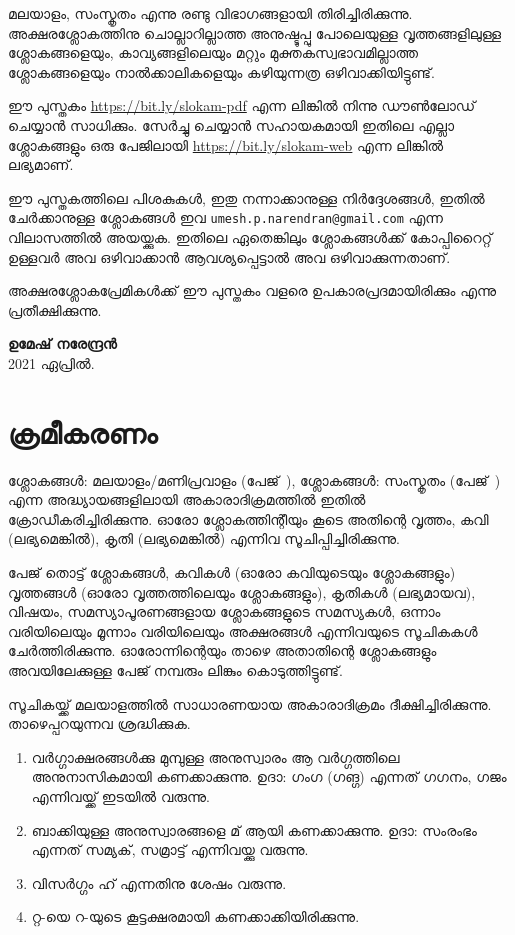 \documentclass{article}
\begin{document}
മലയാളം, സംസ്കൃതം എന്നു രണ്ടു വിഭാഗങ്ങളായി തിരിച്ചിരിക്കുന്നു.   അക്ഷരശ്ലോകത്തിനു ചൊല്ലാറില്ലാത്ത
അനുഷ്ടുപ്പു പോലെയുള്ള വൃത്തങ്ങളിലുള്ള ശ്ലോകങ്ങളെയും, കാവ്യങ്ങളിലെയും മറ്റും
മുക്തകസ്വഭാവമില്ലാത്ത ശ്ലോകങ്ങളെയും നാല്‍ക്കാലികളെയും കഴിയുന്നത്ര ഒഴിവാക്കിയിട്ടുണ്ട്. 

ഈ പുസ്തകം
\url{https://bit.ly/slokam-pdf}
എന്ന ലിങ്കില്‍ നിന്നു ഡൗണ്‍ലോഡ് ചെയ്യാന്‍ സാധിക്കും.  സേര്‍ച്ചു ചെയ്യാന്‍ സഹായകമായി ഇതിലെ എല്ലാ ശ്ലോകങ്ങളും ഒരു
പേജിലായി
\url{https://bit.ly/slokam-web}
എന്ന ലിങ്കില്‍ ലഭ്യമാണ്.

ഈ പുസ്തകത്തിലെ പിശകുകള്‍, ഇതു നന്നാക്കാനുള്ള നിര്‍ദ്ദേശങ്ങള്‍, ഇതില്‍ ചേര്‍ക്കാനുള്ള ശ്ലോകങ്ങള്‍
ഇവ \texttt{umesh.p.narendran@gmail.com} എന്ന വിലാസത്തില്‍ അയയ്ക്കുക.  ഇതിലെ
ഏതെങ്കിലും ശ്ലോകങ്ങള്‍ക്ക് കോപ്പിറൈറ്റ് ഉള്ളവര്‍ അവ ഒഴിവാക്കാന്‍ ആവശ്യപ്പെട്ടാല്‍ അവ
ഒഴിവാക്കുന്നതാണ്. 

അക്ഷരശ്ലോകപ്രേമികള്‍ക്ക് ഈ പുസ്തകം വളരെ ഉപകാരപ്രദമായിരിക്കും എന്നു പ്രതീക്ഷിക്കുന്നു.

\begin{flushright}
\textbf{ഉമേഷ് നരേന്ദ്രന്‍}\\
2021 ഏപ്രില്‍. 
\end{flushright}


\clearpage

\tableofcontents

\clearpage
\section{ക്രമീകരണം}
ശ്ലോകങ്ങൾ: മലയാളം/മണിപ്രവാളം (പേജ്~\pageref{sec:slokams:mal}), ശ്ലോകങ്ങൾ: സംസ്കൃതം (പേജ്~\pageref{sec:slokams:san}) എന്ന
അദ്ധ്യായങ്ങളിലായി അകാരാദിക്രമത്തിൽ \NTotalSlokams{} ഇതിൽ
ക്രോഡീകരിച്ചിരിക്കുന്നു. ഓരോ ശ്ലോകത്തിന്റീയും കൂടെ അതിന്റെ വൃത്തം, കവി (ലഭ്യമെങ്കിൽ),
കൃതി (ലഭ്യമെങ്കിൽ) എന്നിവ സൂചിപ്പിച്ചിരിക്കുന്നു.

പേജ് \pageref{sec:index} തൊട്ട് ശ്ലോകങ്ങൾ, കവികൾ (ഓരോ കവിയുടെയും ശ്ലോകങ്ങളും) വൃത്തങ്ങൾ (ഓരോ വൃത്തത്തിലെയും
ശ്ലോകങ്ങളും), കൃതികൾ (ലഭ്യമായവ), വിഷയം, സമസ്യാപൂരണങ്ങളായ ശ്ലോകങ്ങളുടെ സമസ്യകൾ,
ഒന്നാം വരിയിലെയും മൂന്നാം വരിയിലെയും അക്ഷരങ്ങൾ എന്നിവയുടെ സൂചികകൾ ചേർത്തിരിക്കുന്നു.
ഓരോന്നിന്റെയും താഴെ അതാതിന്റെ ശ്ലോകങ്ങളും അവയിലേക്കുള്ള പേജ് നമ്പരും ലിങ്കും
കൊടുത്തിട്ടുണ്ട്. 

സൂചികയ്ക്ക് മലയാളത്തിൽ സാധാരണയായ അകാരാദിക്രമം ദീക്ഷിച്ചിരിക്കുന്നു.  താഴെപ്പറയുന്നവ
ശ്രദ്ധിക്കുക.

\begin{enumerate}
\item വർഗ്ഗാക്ഷരങ്ങൾക്കു മുമ്പുള്ള അനുസ്വാരം ആ വർഗ്ഗത്തിലെ അനുനാസികമായി കണക്കാക്കുന്നു.  ഉദാ:
ഗംഗ (ഗങ്ഗ) എന്നത് ഗഗനം, ഗജം എന്നിവയ്ക്ക് ഇടയിൽ വരുന്നു. 

\item ബാക്കിയുള്ള അനുസ്വാരങ്ങളെ മ് ആയി കണക്കാക്കുന്നു.  ഉദാ: സംരംഭം എന്നത് സമ്യക്, സമ്രാട്ട്
എന്നിവയ്ക്കു വരുന്നു.

\item വിസർഗ്ഗം ഹ് എന്നതിനു ശേഷം വരുന്നു. 

\item റ്റ-യെ റ-യുടെ കൂട്ടക്ഷരമായി കണക്കാക്കിയിരിക്കുന്നു. 
\end{enumerate}
\end{document}
